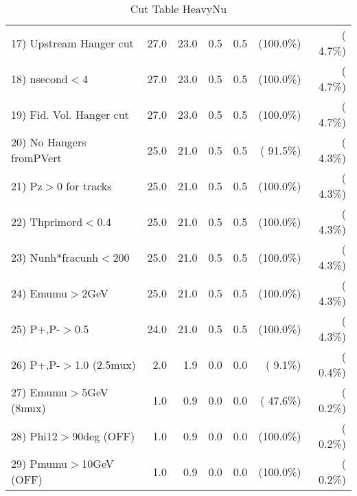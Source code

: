 \begin{table}[h!]
\begin{tabular}{||l||r|r|r|r|r|r||}
 17) Upstream Hanger cut  &         27.0 &         23.0 &          0.5 &          0.5 & (100.0\%) & (  4.7\%) \\
 18) nsecond$<$4          &         27.0 &         23.0 &          0.5 &          0.5 & (100.0\%) & (  4.7\%) \\
 19) Fid. Vol. Hanger cut &         27.0 &         23.0 &          0.5 &          0.5 & (100.0\%) & (  4.7\%) \\
 20) No Hangers fromPVert &         25.0 &         21.0 &          0.5 &          0.5 & ( 91.5\%) & (  4.3\%) \\
 21) Pz$>$0 for tracks    &         25.0 &         21.0 &          0.5 &          0.5 & (100.0\%) & (  4.3\%) \\
 22) Thprimord$<$0.4      &         25.0 &         21.0 &          0.5 &          0.5 & (100.0\%) & (  4.3\%) \\
 23) Nunh*fracunh$<$200   &         25.0 &         21.0 &          0.5 &          0.5 & (100.0\%) & (  4.3\%) \\
 24) Emumu$>$2GeV         &         25.0 &         21.0 &          0.5 &          0.5 & (100.0\%) & (  4.3\%) \\
 25) P+,P-$>$0.5          &         24.0 &         21.0 &          0.5 &          0.5 & (100.0\%) & (  4.3\%) \\
 26) P+,P-$>$1.0 (2.5mux) &          2.0 &          1.9 &          0.0 &          0.0 & (  9.1\%) & (  0.4\%) \\
 27) Emumu$>$5GeV  (8mux) &          1.0 &          0.9 &          0.0 &          0.0 & ( 47.6\%) & (  0.2\%) \\
 28) Phi12$>$90deg  (OFF) &          1.0 &          0.9 &          0.0 &          0.0 & (100.0\%) & (  0.2\%) \\
 29) Pmumu$>$10GeV  (OFF) &          1.0 &          0.9 &          0.0 &          0.0 & (100.0\%) & (  0.2\%) \\
 \hline
 \hline
 \end{tabular}
 \caption{Cut Table  HeavyNu  }
 \label{tab-cutheavy_neutrino}
 \end{table}
